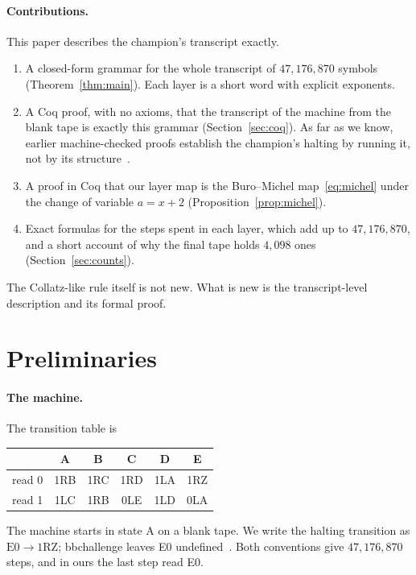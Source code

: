 \documentclass[11pt]{article}
\theoremstyle{definition}
\theoremstyle{remark}
\begin{document}
\paragraph{Contributions.} This paper describes the champion's transcript exactly.
\begin{enumerate}
  \item A closed-form grammar for the whole transcript of $47{,}176{,}870$ symbols
        (Theorem~\ref{thm:main}). Each layer is a short word with explicit exponents.
  \item A Coq proof, with no axioms, that the transcript of the machine from the blank
        tape is exactly this grammar (Section~\ref{sec:coq}). As far as we know, earlier
        machine-checked proofs establish the champion's halting by running it, not by
        its structure~\cite{bbchallenge,coqbb5}.
  \item A proof in Coq that our layer map is the Buro--Michel map~\eqref{eq:michel}
        under the change of variable $a=x+2$ (Proposition~\ref{prop:michel}).
  \item Exact formulas for the steps spent in each layer, which add up to
        $47{,}176{,}870$, and a short account of why the final tape holds $4{,}098$ ones
        (Section~\ref{sec:counts}).
\end{enumerate}
The Collatz-like rule itself is not new. What is new is the transcript-level
description and its formal proof.

\section{Preliminaries}

\paragraph{The machine.} The transition table is
\begin{center}
\begin{tabular}{cccccc}
\toprule
 & A & B & C & D & E\\
\midrule
read 0 & 1RB & 1RC & 1RD & 1LA & 1RZ\\
read 1 & 1LC & 1RB & 0LE & 1LD & 0LA\\
\bottomrule
\end{tabular}
\end{center}
The machine starts in state A on a blank tape. We write the halting transition as
$\mathrm{E0}\to\mathrm{1RZ}$; bbchallenge leaves E0 undefined~\cite{bbchallenge}.
Both conventions give $47{,}176{,}870$ steps, and in ours the last step read E0.
\end{document}
